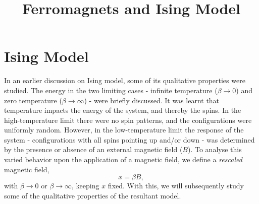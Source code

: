 \documentclass[letterpaper,english,12pt]{article}
\title{Ferromagnets and Ising Model}
\begin{document}
\maketitle
\section{Ising Model}

In an earlier discussion on Ising model, some of its qualitative properties were studied. The energy in the two limiting cases - infinite temperature ($\beta \to 0$) and zero temperature ($\beta \to \infty$) - were briefly discussed. It was learnt that temperature impacts the energy of the system, and thereby the spins. In the high-temperature limit there were no spin patterns, and the configurations were uniformly random. However, in the low-temperature limit the response of the system - configurations with all spins pointing up and/or down - was determined by the presence or absence of an external magnetic field ($B$). To analyse this varied behavior upon the application of a magnetic field, we define a \textit{rescaled} magnetic field, $$x=\beta B,$$ with $\beta \to 0$ or $\beta \to \infty$, keeping $x$ fixed. With this, we will subsequently study some of the qualitative properties of the resultant model.
\end{document}
